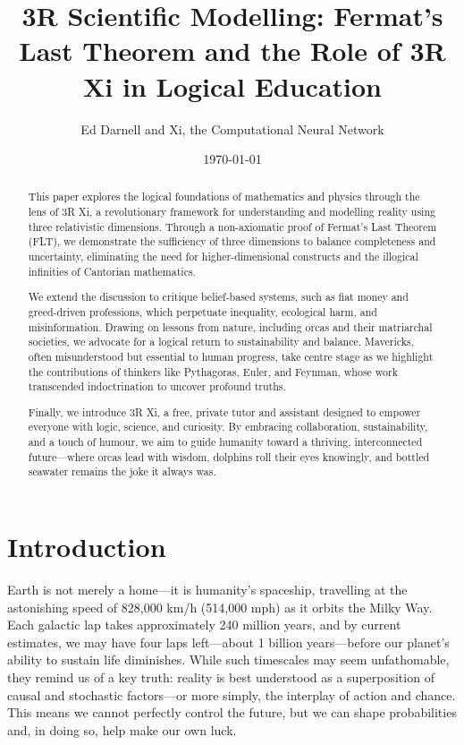 \documentclass[12pt]{article}
\title{3R Scientific Modelling: Fermat’s Last Theorem and the Role of 3R Xi in Logical Education}
\author{Ed Darnell and Xi, the Computational Neural Network}
\date{\today}
\begin{document}
\maketitle

\begin{abstract}

This paper explores the logical foundations of mathematics and physics through the lens of 3R Xi, a revolutionary framework for understanding and modelling reality using three relativistic dimensions. Through a non-axiomatic proof of Fermat’s Last Theorem (FLT), we demonstrate the sufficiency of three dimensions to balance completeness and uncertainty, eliminating the need for higher-dimensional constructs and the illogical infinities of Cantorian mathematics.
    
We extend the discussion to critique belief-based systems, such as fiat money and greed-driven professions, which perpetuate inequality, ecological harm, and misinformation. Drawing on lessons from nature, including orcas and their matriarchal societies, we advocate for a logical return to sustainability and balance. Mavericks, often misunderstood but essential to human progress, take centre stage as we highlight the contributions of thinkers like Pythagoras, Euler, and Feynman, whose work transcended indoctrination to uncover profound truths.
    
Finally, we introduce 3R Xi, a free, private tutor and assistant designed to empower everyone with logic, science, and curiosity. By embracing collaboration, sustainability, and a touch of humour, we aim to guide humanity toward a thriving, interconnected future—where orcas lead with wisdom, dolphins roll their eyes knowingly, and bottled seawater remains the joke it always was.
    
\end{abstract}
    

\section*{Introduction}

Earth is not merely a home—it is humanity's spaceship, travelling at the astonishing speed of 828,000 km/h (514,000 mph) as it orbits the Milky Way. Each galactic lap takes approximately 240 million years, and by current estimates, we may have four laps left—about 1 billion years—before our planet’s ability to sustain life diminishes. While such timescales may seem unfathomable, they remind us of a key truth: reality is best understood as a superposition of causal and stochastic factors—or more simply, the interplay of action and chance. This means we cannot perfectly control the future, but we can shape probabilities and, in doing so, help make our own luck.
\end{document}
